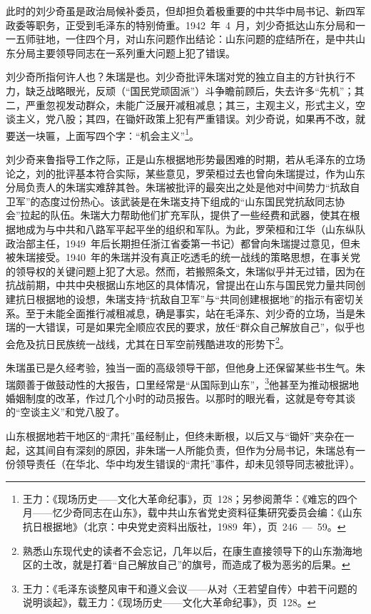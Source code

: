 此时的刘少奇虽是政治局候补委员，但却担负着极重要的中共华中局书记、新四军政委等职务，正受到毛泽东的特别倚重。1942~年~4~月，刘少奇抵达山东分局和一一五师驻地，一住四个月，对山东问题作出结论：山东问题的症结所在，是中共山东分局主要领导同志在一系列重大问题上犯了错误。

刘少奇所指何许人也？朱瑞是也。刘少奇批评朱瑞对党的独立自主的方针执行不力，缺乏战略眼光，反顽（“国民党顽固派”）斗争瞻前顾后，失去许多“先机”；其二，严重忽视发动群众，未能广泛展开减租减息；其三，主观主义，形式主义，空谈主义，党八股；其四，在锄奸政策上犯有严重错误。刘少奇说，如果再不改，就要送一块匾，上面写四个字：“机会主义”\footnote{王力：《现场历史——文化大革命纪事》，页~128；另参阅萧华：《难忘的四个月——忆少奇同志在山东》，载中共山东省党史资料征集研究委员会编：《山东抗日根据地》（北京：中央党史资料出版社，1989~年），页~246~—~59。}。

刘少奇来鲁指导工作之际，正是山东根据地形势最困难的时期，若从毛泽东的立场论之，刘的批评基本符合实际，某些意见，罗荣桓过去也曾向朱瑞提过，作为山东分局负责人的朱瑞实难辞其咎。朱瑞被批评的最突出之处是他对中间势力“抗敌自卫军”的态度过份热心。该武装是在朱瑞支持下组成的“山东国民党抗敌同志协会”拉起的队伍。朱瑞大力帮助他们扩充军队，提供了一些经费和武器，使其在根据地成为与中共和八路军平起平坐的组织和军队。为此，罗荣桓和江华（山东纵队政治部主任，1949~年后长期担任浙江省委第一书记）都曾向朱瑞提过意见，但未被朱瑞接受。1940~年的朱瑞并没有真正吃透毛的统一战线的策略思想，在事关党的领导权的关键问题上犯了大忌。然而，若搬照条文，朱瑞似乎并无过错，因为在抗战前期，中共中央根据山东地区的具体情况，曾提出在山东与国民党力量共同创建抗日根据地的设想，朱瑞支持“抗敌自卫军”与“共同创建根据地”的指示有密切关系。至于未能全面推行减租减息，确是事实，站在毛泽东、刘少奇的立场，当是朱瑞的一大错误，可是如果完全顺应农民的要求，放任“群众自己解放自己”，似乎也会危及抗日民族统一战线，尤其在日军空前残酷进攻的形势下\footnote{熟悉山东现代史的读者不会忘记，几年以后，在康生直接领导下的山东渤海地区的土改，就是打着“自己解放自己”的旗号，而造成了极为恶劣的后果。}。

朱瑞虽已是久经考验，独当一面的高级领导干部，但他身上还保留某些书生气。朱瑞颇善于做鼓动性的大报告，口里经常是“从国际到山东”，\footnote{王力：《毛泽东谈整风审干和遵义会议——从对〈王若望自传〉中若干问题的说明谈起》，载王力：《现场历史——文化大革命纪事》，页~128。}他甚至为推动根据地婚姻制度的改革，作过几个小时的动员报告。以那时的眼光看，这就是夸夸其谈的“空谈主义”和党八股了。

山东根据地若干地区的“肃托”虽经制止，但终未断根，以后又与“锄奸”夹杂在一起，这其间自有深刻的原因，非朱瑞一人所能负责，但作为分局书记，朱瑞总有一份领导责任（在华北、华中均发生错误的“肃托”事件，却未见领导同志被批评）。

